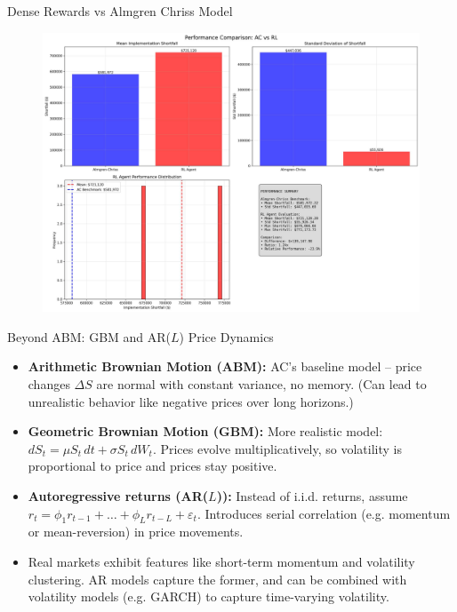\documentclass[11pt,aspectratio=169]{beamer}   %
\begin{document}
\begin{frame}{Dense Rewards vs Almgren Chriss Model}
	\begin{figure}[ht]
		\centering
		\includegraphics[width=0.6\linewidth]{performance_comparison.pdf}
		\caption{}
	\end{figure}
\end{frame}

\begin{frame}{Beyond ABM: GBM and AR($L$) Price Dynamics}
	\begin{itemize}
		\item \textbf{Arithmetic Brownian Motion (ABM):} AC’s baseline model – price changes $\Delta S$ are normal with constant variance, no memory. (Can lead to unrealistic behavior like negative prices over long horizons.)
		\item \textbf{Geometric Brownian Motion (GBM):} More realistic model: $dS_t = \mu S_t\,dt + \sigma S_t\,dW_t$. Prices evolve multiplicatively, so volatility is proportional to price and prices stay positive.
		\item \textbf{Autoregressive returns (AR($L$)):} Instead of i.i.d. returns, assume $r_{t} = \phi_1 r_{t-1} + \dots + \phi_L r_{t-L} + \varepsilon_t$. Introduces serial correlation (e.g. momentum or mean-reversion) in price movements.
		\item Real markets exhibit features like short-term momentum and volatility clustering. AR models capture the former, and can be combined with volatility models (e.g. GARCH) to capture time-varying volatility.
	\end{itemize}
\end{frame}
		
\end{document}
